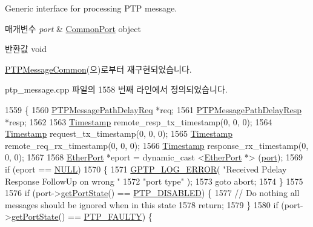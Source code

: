 Generic interface for processing P\+TP message. 


\begin{DoxyParams}{매개변수}
{\em port} & \hyperlink{class_common_port}{Common\+Port} object \\
\hline
\end{DoxyParams}
\begin{DoxyReturn}{반환값}
void 
\end{DoxyReturn}


\hyperlink{class_p_t_p_message_common_a45670a42f5684252d52543f9ed3a1551}{P\+T\+P\+Message\+Common}(으)로부터 재구현되었습니다.



ptp\+\_\+message.\+cpp 파일의 1558 번째 라인에서 정의되었습니다.


\begin{DoxyCode}
1559 \{
1560     \hyperlink{class_p_t_p_message_path_delay_req}{PTPMessagePathDelayReq} *req;
1561     \hyperlink{class_p_t_p_message_path_delay_resp}{PTPMessagePathDelayResp} *resp;
1562 
1563     \hyperlink{class_timestamp}{Timestamp} remote\_resp\_tx\_timestamp(0, 0, 0);
1564     \hyperlink{class_timestamp}{Timestamp} request\_tx\_timestamp(0, 0, 0);
1565     \hyperlink{class_timestamp}{Timestamp} remote\_req\_rx\_timestamp(0, 0, 0);
1566     \hyperlink{class_timestamp}{Timestamp} response\_rx\_timestamp(0, 0, 0);
1567 
1568     \hyperlink{class_ether_port}{EtherPort} *eport = dynamic\_cast <\hyperlink{class_ether_port}{EtherPort} *> (\hyperlink{gst__avb__playbin_8c_a63c89c04d1feae07ca35558055155ffb}{port});
1569     \textcolor{keywordflow}{if} (eport == \hyperlink{openavb__types__base__pub_8h_a070d2ce7b6bb7e5c05602aa8c308d0c4}{NULL})
1570     \{
1571         \hyperlink{gptp__log_8hpp_afefbb1009717c128012bfeed94842987}{GPTP\_LOG\_ERROR}( \textcolor{stringliteral}{"Received Pdelay Response FollowUp on wrong "}
1572                 \textcolor{stringliteral}{"port type"} );
1573         \textcolor{keywordflow}{goto} abort;
1574     \}
1575 
1576     \textcolor{keywordflow}{if} (port->\hyperlink{class_common_port_aa4182d914fdb9a27fb875d8495e0289c}{getPortState}() == \hyperlink{ptptypes_8hpp_a679431f1afc75d7bb9e972c022e53672a38f3a091adeb361140c66f2f6dc44df7}{PTP\_DISABLED}) \{
1577         \textcolor{comment}{// Do nothing all messages should be ignored when in this state}
1578         \textcolor{keywordflow}{return};
1579     \}
1580     \textcolor{keywordflow}{if} (port->\hyperlink{class_common_port_aa4182d914fdb9a27fb875d8495e0289c}{getPortState}() == \hyperlink{ptptypes_8hpp_a679431f1afc75d7bb9e972c022e53672ac2e47460540ecdcec420be97a0bb9ff2}{PTP\_FAULTY}) \{

\end{DoxyCode}
